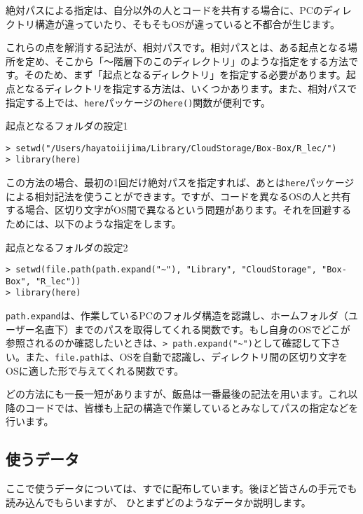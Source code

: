絶対パスによる指定は、自分以外の人とコードを共有する場合に、PCのディレクトリ構造が違っていたり、そもそもOSが違っていると不都合が生じます。

これらの点を解消する記法が、相対パスです。相対パスとは、ある起点となる場所を定め、そこから「〜階層下のこのディレクトリ」のような指定をする方法です。そのため、まず「起点となるディレクトリ」を指定する必要があります。起点となるディレクトリを指定する方法は、いくつかあります。また、相対パスで指定する上では、\texttt{here}パッケージの\texttt{here()}関数が便利です。

\begin{itembox}[l]{起点となるフォルダの設定1}
\begin{verbatim}
> setwd("/Users/hayatoiijima/Library/CloudStorage/Box-Box/R_lec/")
> library(here)
\end{verbatim}
\end{itembox}

この方法の場合、最初の1回だけ絶対パスを指定すれば、あとは\texttt{here}パッケージによる相対記法を使うことができます。ですが、コードを異なるOSの人と共有する場合、区切り文字がOS間で異なるという問題があります。それを回避するためには、以下のような指定をします。

\begin{itembox}[l]{起点となるフォルダの設定2}
\begin{verbatim}
> setwd(file.path(path.expand("~"), "Library", "CloudStorage", "Box-Box", "R_lec"))
> library(here)
\end{verbatim}
\end{itembox}
\texttt{path.expand}は、作業しているPCのフォルダ構造を認識し、ホームフォルダ（ユーザー名直下）までのパスを取得してくれる関数です。もし自身のOSでどこが参照されるのか確認したいときは、\verb|> path.expand("~")|として確認して下さい。また、\texttt{file.path}は、OSを自動で認識し、ディレクトリ間の区切り文字をOSに適した形で与えてくれる関数です。

どの方法にも一長一短がありますが、飯島は一番最後の記法を用います。これ以降のコードでは、皆様も上記の構造で作業しているとみなしてパスの指定などを行います。

  \subsection{使うデータ}
ここで使うデータについては、すでに配布しています。後ほど皆さんの手元でも読み込んでもらいますが、
ひとまずどのようなデータか説明します。

